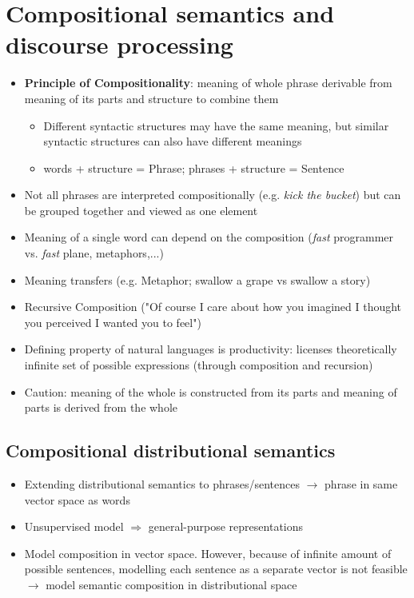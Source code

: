 \section{Compositional semantics and discourse processing}
\begin{itemize}
	\item \textbf{Principle of Compositionality}: meaning of whole phrase derivable from meaning of its parts and structure to combine them
	\begin{itemize}
		\item Different syntactic structures may have the same meaning, but similar syntactic structures can also have different meanings
		\item words + structure = Phrase; phrases + structure = Sentence
	\end{itemize}
	\item Not all phrases are interpreted compositionally (e.g. \textit{kick the bucket}) but can be grouped together and viewed as one element
	\item Meaning of a single word can depend on the composition (\textit{fast} programmer vs. \textit{fast} plane, metaphors,...)
	\item Meaning transfers (e.g. Metaphor; swallow a grape vs swallow a story)
	\item Recursive Composition ("Of course I care about how you imagined I thought you perceived I wanted you to feel")
	\item Defining property of natural languages is productivity: licenses theoretically infinite set of possible expressions (through composition and recursion)
	\item Caution: meaning of the whole is constructed from its parts and meaning of parts is derived from the whole
\end{itemize}
\subsection{Compositional distributional semantics}
\begin{itemize}
	\item Extending distributional semantics to phrases/sentences $\rightarrow$ phrase in same vector space as words
	\item Unsupervised model $\Rightarrow$ general-purpose representations
	\item Model composition in vector space. However, because of infinite amount of possible sentences, modelling each sentence as a separate vector is not feasible $\rightarrow$ model semantic composition in distributional space
\end{itemize}

